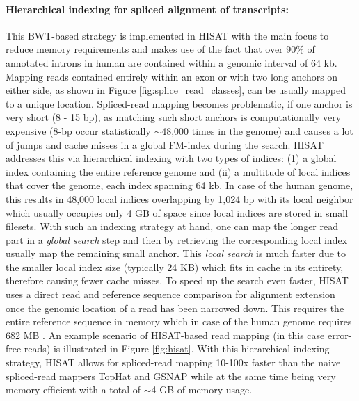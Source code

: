 \paragraph{Hierarchical indexing for spliced alignment of transcripts:} This BWT-based strategy is implemented in HISAT \citep{Kim2015} with the main focus to reduce memory requirements and makes use of the fact that over 90\% of annotated introns in human are contained within a genomic interval of 64 kb. Mapping reads contained entirely within an exon or with two long anchors on either side, as shown in Figure \ref{fig:splice_read_classes}, can be usually mapped to a unique location. Spliced-read mapping becomes problematic, if one anchor is very short (8 - 15 bp), as matching such short anchors is computationally very expensive (8-bp occur statistically $\sim$48,000 times in the genome) and causes a lot of jumps and cache misses in a global FM-index \citep{Kim2015} during the search. HISAT addresses this via hierarchical indexing with two types of indices: (1) a global index containing the entire reference genome and (ii) a multitude of local indices that cover the genome, each index spanning 64 kb. In case of the human genome, this results in 48,000 local indices overlapping by 1,024 bp with its local neighbor which usually occupies only 4 GB of space since local indices are stored in small filesets. With such an indexing strategy at hand, one can map the longer read part in a \textit{global search} step and then by retrieving the corresponding local index usually map the remaining small anchor. This \textit{local search} is much faster due to the smaller local index size (typically 24 KB) which fits in cache in its entirety, therefore causing fewer cache misses. To speed up the search even faster, HISAT uses a direct read and reference sequence comparison for alignment extension once the genomic location of a read has been narrowed down. This requires the entire reference sequence in memory which in case of the human genome requires 682 MB \citep{Kim2015}. An example scenario of HISAT-based read mapping (in this case error-free reads) is illustrated in Figure \ref{fig:hisat}. With this hierarchical indexing strategy, HISAT allows for spliced-read mapping 10-100x faster than the naive spliced-read mappers TopHat and GSNAP while at the same time being very memory-efficient with a total of $\sim$4 GB of memory usage.

